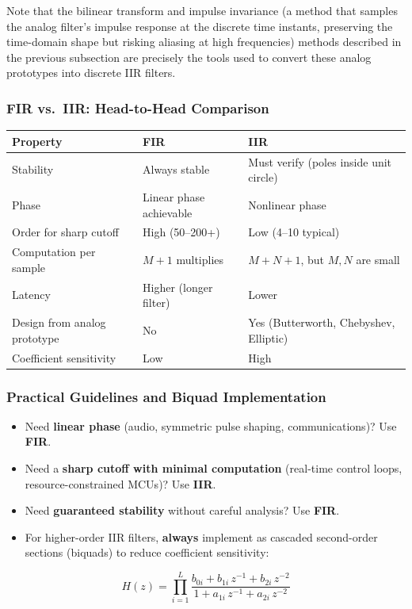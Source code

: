 Note that the bilinear transform and impulse invariance (a method that samples the analog filter's impulse response at the discrete time instants, preserving the time-domain shape but risking aliasing at high frequencies) methods described in the
previous subsection are precisely the tools used to convert these analog prototypes
into discrete IIR filters.

\subsubsection{FIR vs.\ IIR: Head-to-Head Comparison}

\begin{center}
\begin{tabular}{lll}
\toprule
\textbf{Property} & \textbf{FIR} & \textbf{IIR} \\
\midrule
Stability & Always stable & Must verify (poles inside unit circle) \\
Phase & Linear phase achievable & Nonlinear phase \\
Order for sharp cutoff & High (50--200+) & Low (4--10 typical) \\
Computation per sample & $M+1$ multiplies & $M+N+1$, but $M,N$ are small \\
Latency & Higher (longer filter) & Lower \\
Design from analog prototype & No & Yes (Butterworth, Chebyshev, Elliptic) \\
Coefficient sensitivity & Low & High \\
\bottomrule
\end{tabular}
\end{center}

\subsubsection{Practical Guidelines and Biquad Implementation}

\begin{itemize}
    \item Need \textbf{linear phase} (audio, symmetric pulse shaping, communications)?
          Use \textbf{FIR}.
    \item Need a \textbf{sharp cutoff with minimal computation} (real-time control
          loops, resource-constrained MCUs)? Use \textbf{IIR}.
    \item Need \textbf{guaranteed stability} without careful analysis? Use
          \textbf{FIR}.
    \item For higher-order IIR filters, \textbf{always} implement as cascaded
          second-order sections (biquads) to reduce coefficient sensitivity:
\end{itemize}
\begin{equation}
H(z) = \prod_{i=1}^{L}
       \frac{b_{0i} + b_{1i}\,z^{-1} + b_{2i}\,z^{-2}}
            {1   + a_{1i}\,z^{-1} + a_{2i}\,z^{-2}}
\end{equation}

